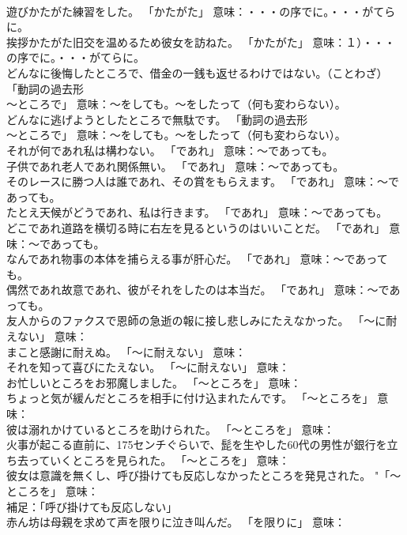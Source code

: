 \documentclass[8pt]{extreport}
\begin{document}
\begin{CJK}{UTF8}{min}
\\	遊びかたがた練習をした。	「かたがた」 意味：・・・の序でに。・・・がてらに。	
\\	挨拶かたがた旧交を温めるため彼女を訪ねた。	「かたがた」 意味：１）・・・の序でに。・・・がてらに。	
\\	どんなに後悔したところで、借金の一銭も返せるわけではない。（ことわざ）	「動詞の過去形 
\\	～ところで」 意味：～をしても。～をしたって（何も変わらない）。	
\\	どんなに逃げようとしたところで無駄です。	「動詞の過去形 
\\	～ところで」 意味：～をしても。～をしたって（何も変わらない）。	
\\	それが何であれ私は構わない。	「であれ」 意味：～であっても。	
\\	子供であれ老人であれ関係無い。	「であれ」 意味：～であっても。	
\\	そのレースに勝つ人は誰であれ、その賞をもらえます。	「であれ」 意味：～であっても。	
\\	たとえ天候がどうであれ、私は行きます。	「であれ」 意味：～であっても。	
\\	どこであれ道路を横切る時に右左を見るというのはいいことだ。	「であれ」 意味：～であっても。	
\\	なんであれ物事の本体を捕らえる事が肝心だ。	「であれ」 意味：～であっても。	
\\	偶然であれ故意であれ、彼がそれをしたのは本当だ。	「であれ」 意味：～であっても。	
\\	友人からのファクスで恩師の急逝の報に接し悲しみにたえなかった。	「～に耐えない」 意味：
\\	まこと感謝に耐えぬ。	「～に耐えない」 意味：
\\	それを知って喜びにたえない。	「～に耐えない」 意味：
\\	お忙しいところをお邪魔しました。	「～ところを」 意味：
\\	ちょっと気が緩んだところを相手に付け込まれたんです。	「～ところを」 意味：
\\	彼は溺れかけているところを助けられた。	「～ところを」 意味：
\\	火事が起こる直前に、175センチぐらいで、髭を生やした60代の男性が銀行を立ち去っていくところを見られた。	「～ところを」 意味：
\\	彼女は意識を無くし、呼び掛けても反応しなかったところを発見された。	"「～ところを」 意味：
\\	補足：「呼び掛けても反応しない」
\\	赤ん坊は母親を求めて声を限りに泣き叫んだ。	「を限りに」 意味：

\end{CJK}
\end{document}
